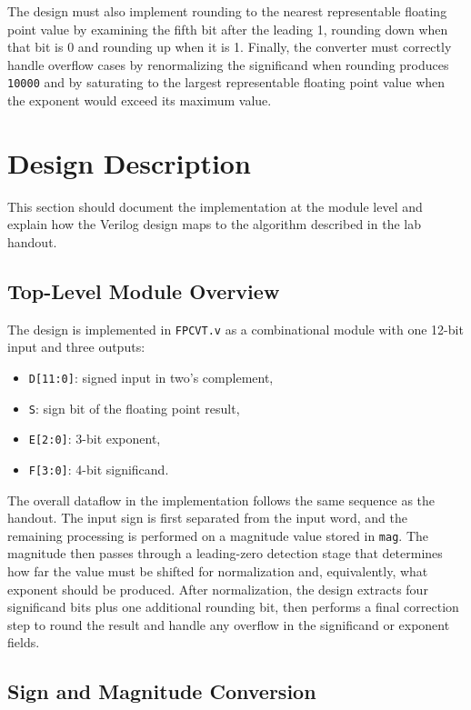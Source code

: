 \documentclass[10pt,letterpaper]{article}
\begin{document}
The design must also implement rounding to the nearest representable floating point value by examining the fifth bit after the leading 1, rounding down when that bit is 0 and rounding up when it is 1. Finally, the converter must correctly handle overflow cases by renormalizing the significand when rounding produces \texttt{10000} and by saturating to the largest representable floating point value when the exponent would exceed its maximum value.

\section{Design Description}

This section should document the implementation at the module level and explain how the Verilog design maps to the algorithm described in the lab handout.

\subsection{Top-Level Module Overview}

The design is implemented in \texttt{FPCVT.v} as a combinational module with one 12-bit input and three outputs:

\begin{itemize}
    \item \texttt{D[11:0]}: signed input in two's complement,
    \item \texttt{S}: sign bit of the floating point result,
    \item \texttt{E[2:0]}: 3-bit exponent,
    \item \texttt{F[3:0]}: 4-bit significand.
\end{itemize}

The overall dataflow in the implementation follows the same sequence as the handout. The input sign is first separated from the input word, and the remaining processing is performed on a magnitude value stored in \texttt{mag}. The magnitude then passes through a leading-zero detection stage that determines how far the value must be shifted for normalization and, equivalently, what exponent should be produced. After normalization, the design extracts four significand bits plus one additional rounding bit, then performs a final correction step to round the result and handle any overflow in the significand or exponent fields.

\subsection{Sign and Magnitude Conversion}
\end{document}
